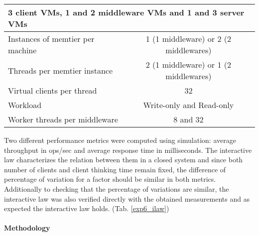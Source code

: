 \documentclass[report.tex]{subfiles}
\begin{document}
\begin{center}
	\scriptsize{
		\begin{tabular}{|l|c|}
			\multicolumn{2}{l}{3 client VMs, 1 and 2 middleware VMs and 1 and 3 server VMs}\\
			\hline Instances of memtier per machine & 1 (1 middleware) or 2 (2 middlewares) \\ 
			\hline Threads per memtier instance     & 2 (1 middleware) or 1 (2 middlewares)   \\
			\hline Virtual clients per thread       &  32                                     \\ 
			\hline Workload                         & Write-only and Read-only\\
			\hline Worker threads per middleware    & 8 and 32                                    \\
			\hline 
		\end{tabular}
	} 
\end{center}


Two different performance metrics were computed using simulation: average throughput in ops/sec and average response time in milliseconds. The interactive law characterizes the relation between them in a closed system and since both number of clients and client thinking time remain fixed, the difference of percentage of variation for a factor should be similar in both metrics.
Additionally to checking that the percentage of variations are similar, the interactive law was also verified directly with the obtained measurements and as expected the interactive law holds. (Tab. \ref{exp6_ilaw})

\paragraph{Methodology}
\end{document}
